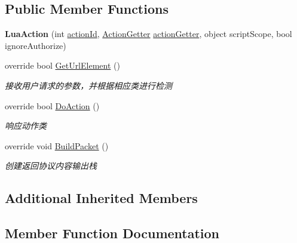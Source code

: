 \subsection*{Public Member Functions}
\begin{DoxyCompactItemize}
\item 
\mbox{\label{class_t_net_1_1_contract_1_1_action_1_1_lua_action_a0885ead28733e4fb6715444dec1f1278}} 
{\bfseries Lua\+Action} (int \mbox{\hyperlink{class_t_net_1_1_service_1_1_game_struct_a8c3c761a891a0da9d72d17d34a0f7446}{action\+Id}}, \mbox{\hyperlink{class_t_net_1_1_service_1_1_action_getter}{Action\+Getter}} \mbox{\hyperlink{class_t_net_1_1_service_1_1_game_struct_a14dcf224eb5a73e2c0b3bee4fe359dd8}{action\+Getter}}, object script\+Scope, bool ignore\+Authorize)
\item 
override bool \mbox{\hyperlink{class_t_net_1_1_contract_1_1_action_1_1_lua_action_aa240dc37a9c5ebcaea3ef54ade197086}{Get\+Url\+Element}} ()
\begin{DoxyCompactList}\small\item\em 接收用户请求的参数，并根据相应类进行检测 \end{DoxyCompactList}\item 
override bool \mbox{\hyperlink{class_t_net_1_1_contract_1_1_action_1_1_lua_action_a78a9480dd9ac68c156592326ac5e04bf}{Do\+Action}} ()
\begin{DoxyCompactList}\small\item\em 响应动作类 \end{DoxyCompactList}\item 
override void \mbox{\hyperlink{class_t_net_1_1_contract_1_1_action_1_1_lua_action_a729cfe92a20d39f52f74e76cbe573304}{Build\+Packet}} ()
\begin{DoxyCompactList}\small\item\em 创建返回协议内容输出栈 \end{DoxyCompactList}\end{DoxyCompactItemize}
\subsection*{Additional Inherited Members}


\subsection{Member Function Documentation}
\mbox{\label{class_t_net_1_1_contract_1_1_action_1_1_lua_action_a729cfe92a20d39f52f74e76cbe573304}} 
